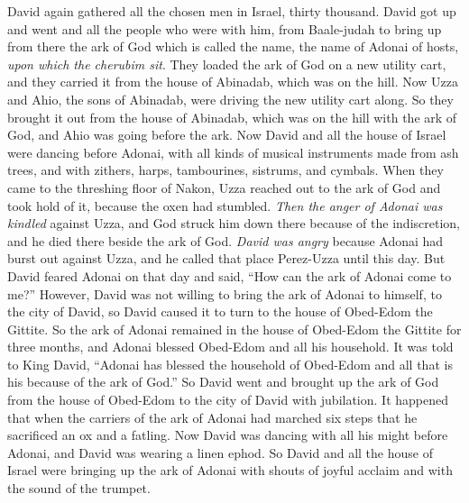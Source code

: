 \begin{biblechapter} %
 David again gathered all the chosen men in Israel, thirty thousand.
\verse David got up and went and all the people who were with him, from Baale-judah to bring up from there the ark of God which is called the name, the name of Adonai of hosts, \textit{upon which the cherubim sit}.
\verse They loaded the ark of God on a new utility cart, and they carried it from the house of Abinadab, which was on the hill. Now Uzza and Ahio, the sons of Abinadab, were driving the new utility cart along.
\verse So they brought it out from the house of Abinadab, which was on the hill with the ark of God, and Ahio was going before the ark.
\verse Now David and all the house of Israel were dancing before Adonai, with all kinds of musical instruments made from ash trees, and with zithers, harps, tambourines, sistrums, and cymbals.
\verse When they came to the threshing floor of Nakon, Uzza reached out to the ark of God and took hold of it, because the oxen had stumbled.
\verse \textit{Then the anger of Adonai was kindled} against Uzza, and God struck him down there because of the indiscretion, and he died there beside the ark of God.
\verse \textit{David was angry} because Adonai had burst out against Uzza, and he called that place Perez-Uzza until this day.
\verse But David feared Adonai on that day and said, “How can the ark of Adonai come to me?”
\verse However, David was not willing to bring the ark of Adonai to himself, to the city of David, so David caused it to turn to the house of Obed-Edom the Gittite.
\verse So the ark of Adonai remained in the house of Obed-Edom the Gittite for three months, and Adonai blessed Obed-Edom and all his household.
\verse It was told to King David, “Adonai has blessed the household of Obed-Edom and all that is his because of the ark of God.” So David went and brought up the ark of God from the house of Obed-Edom to the city of David with jubilation.
\verse It happened that when the carriers of the ark of Adonai had marched six steps that he sacrificed an ox and a fatling.
\verse Now David was dancing with all his might before Adonai, and David was wearing a linen ephod.
\verse So David and all the house of Israel were bringing up the ark of Adonai with shouts of joyful acclaim and with the sound of the trumpet.

\end{biblechapter}
